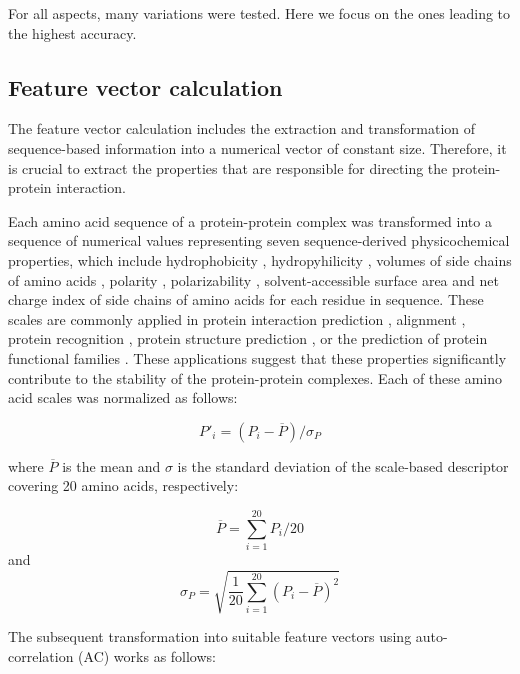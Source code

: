 \documentclass[3p,times,twocolumn]{elsarticle}
\begin{document}
For all aspects, many variations were tested. Here we focus on the
ones leading to the highest accuracy. 


\subsection{Feature vector calculation}
The feature vector calculation includes the extraction and
transformation of sequence-based information into a numerical vector
of constant size. Therefore, it is crucial to extract the properties
that are responsible for directing the protein-protein interaction. 

Each amino acid sequence of a protein-protein complex was transformed
into a sequence of numerical values representing seven
sequence-derived physicochemical properties, which include
hydrophobicity \cite{Eisenberg:1984, Koehler:2009}, hydropyhilicity
\cite{Hopp:1981}, volumes of side chains of amino acids
\cite{Krigbaum:1979}, polarity \cite{Grantham:1974}, polarizability
\cite{Charton:1982}, solvent-accessible surface area \cite{Rose:1985}
and net charge index of side chains of amino acids \cite{Zhou:2006}
for each residue in sequence. These scales are commonly applied in
protein interaction prediction \cite{Bock:2001} \cite{Bock:2003},
alignment \cite{Stamm:2013}, protein recognition \cite{Ding:2001},
protein structure prediction \cite{Durham:2009}, or the prediction of
protein functional families \cite{Cai:2003}. These applications
suggest that these properties significantly contribute to the
stability of the protein-protein complexes. Each of these amino acid
scales was normalized as follows: 

\begin{equation}
P'_{i} = (P_i - \overline{P}) / \sigma_P
\end{equation}

where $\overline{P}$ is the mean and $\sigma$ is the standard
deviation of the scale-based descriptor covering 20 amino acids,
respectively: 

\begin{equation}
\overline{P} = \sum^{20}_{i=1}P_i / 20
\end{equation}
 and 
\begin{equation}
\sigma_P = \sqrt{\frac{1}{20} \sum^{20}_{i=1}(P_i - \overline{P})^2}
\end{equation}

The subsequent transformation into suitable feature vectors using
auto-correlation (AC) works as follows: 
\end{document}
